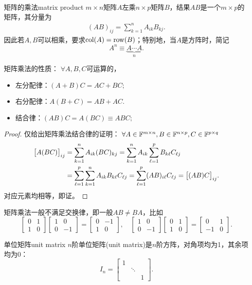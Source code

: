 \begin{definition}{矩阵的乘法}{matrix product}
	$m\times n$矩阵$A$左乘$n\times p$矩阵$B$，结果$AB$是一个$m\times p$的矩阵，其分量为
	\begin{align}
		(AB)_{ij}=\sum_{k=1}^nA_{ik}B_{kj}.
	\end{align}
	因此若$A,B$可以相乘，要求$\operatorname{col}(A)=\operatorname{row}(B)$；特别地，当$A$是方阵时，简记
	\[
		A^n\equiv\underbrace{A\cdots A}_n.
	\]
\end{definition}
\begin{corollary}
	矩阵乘法的性质：%
	$\forall A,B,C$可运算的，
    \begin{itemize}
    	\item 左分配律：$(A+B)C=AC+BC;$
    	\item 右分配律：$A(B+C)=AB+AC.$
        \item 结合律：$(AB)C=A(BC)\equiv ABC;$
    \end{itemize}
\end{corollary}
\begin{proof}
	仅给出矩阵乘法结合律的证明：
	$\forall A\in\mathbb F^{m\times n},B\in\mathbb F^{n\times p},C\in\mathbb F^{p\times q}$
	\begin{align*}
		\bigl[A(BC)\bigr]_{ij}&=\sum_{k=1}^nA_{ik}(BC)_{kj}=\sum_{k=1}^nA_{ik}\sum_{\ell=1}^pB_{k\ell}C_{\ell j}\\
		&=\sum_{\ell=1}^p\sum_{k=1}^nA_{ik}B_{k\ell}C_{\ell j}=\sum_{\ell=1}^p(AB)_{i\ell}C_{\ell j}=\bigl[(AB)C\bigr]_{ij}.
	\end{align*}
	对应元素均相等，即证。
\end{proof}
\begin{remark}
	矩阵乘法一般不满足交换律，即一般$AB\neq BA$，比如
	\[
		\begin{bmatrix}
			0&1\\1&0
		\end{bmatrix}\begin{bmatrix}
			1&0\\0&-1
		\end{bmatrix}=\begin{bmatrix}
			0&-1\\1&0
		\end{bmatrix},\quad\begin{bmatrix}
			1&0\\0&-1
		\end{bmatrix}\begin{bmatrix}
			0&1\\1&0
		\end{bmatrix}=\begin{bmatrix}
			0&1\\-1&0
		\end{bmatrix}.
	\]
\end{remark}
\begin{definition}{单位矩阵}{unit matrix}
	$n$阶单位矩阵(unit matrix)是$n$阶方阵，对角项均为1，其余项均为0：
	\[
		I_n=\begin{bmatrix}
		1&\\ &\ddots\\&&1
		\end{bmatrix}.
	\]
\end{definition}

